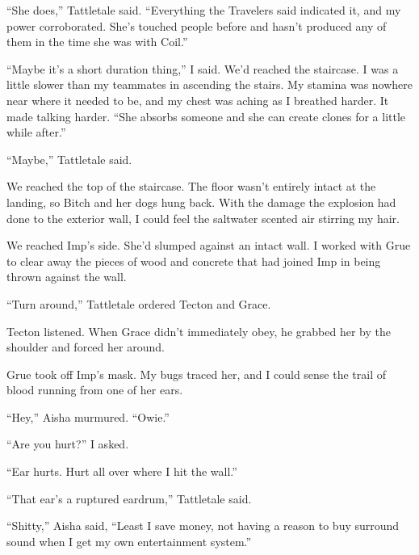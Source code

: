``She does,'' Tattletale said.  ``Everything the Travelers said indicated it, and my power corroborated.  She's touched people before and hasn't produced any of them in the time she was with Coil.''



``Maybe it's a short duration thing,'' I said.  We'd reached the staircase.  I was a little slower than my teammates in ascending the stairs.  My stamina was nowhere near where it needed to be, and my chest was aching as I breathed harder.  It made talking harder.  ``She absorbs someone and she can create clones for a little while after.''



``Maybe,'' Tattletale said.



We reached the top of the staircase.  The floor wasn't entirely intact at the landing, so Bitch and her dogs hung back.  With the damage the explosion had done to the exterior wall, I could feel the saltwater scented air stirring my hair.



We reached Imp's side.  She'd slumped against an intact wall.  I worked with Grue to clear away the pieces of wood and concrete that had joined Imp in being thrown against the wall.



``Turn around,'' Tattletale ordered Tecton and Grace.



Tecton listened.  When Grace didn't immediately obey, he grabbed her by the shoulder and forced her around.



Grue took off Imp's mask.  My bugs traced her, and I could sense the trail of blood running from one of her ears.



``Hey,'' Aisha murmured.  ``Owie.''



``Are you hurt?'' I asked.



``Ear hurts.  Hurt all over where I hit the wall.''



``That ear's a ruptured eardrum,'' Tattletale said.



``Shitty,'' Aisha said, ``Least I save money, not having a reason to buy surround sound when I get my own entertainment system.''



